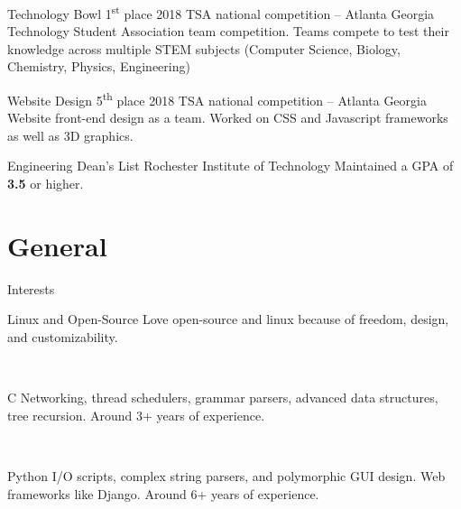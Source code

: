 \documentclass[print]{alternate}
\begin{document}
\begin{entrylist}
\entry
{}
{Technology Bowl 1\textsuperscript{st} place}
{2018 TSA national competition -- Atlanta Georgia}
{Technology Student Association team competition. Teams compete to test their knowledge across multiple STEM subjects (Computer Science, Biology, Chemistry, Physics, Engineering)}

\end{entrylist}
\begin{entrylist}

\entry
{}
{Website Design 5\textsuperscript{th} place}
{2018 TSA national competition -- Atlanta Georgia}
{Website front-end design as a team. Worked on CSS and Javascript frameworks as well as 3D graphics.}


\end{entrylist}
\begin{entrylist}

\entry
{}
{Engineering Dean's List}
{Rochester Institute of Technology}
{Maintained a GPA of \textbf{3.5} or higher.}

\end{entrylist}


\section{General}{Interests}

\vspace{-0.3cm}
\begin{entrylist}
\entry
{}
{Linux and Open-Source}
{}
{Love open-source and linux because of freedom, design, and customizability.}

\end{entrylist}\
\begin{entrylist}
\entry
{}
{C}
{}
{Networking, thread schedulers, grammar parsers, advanced data structures, tree recursion. Around 3+ years of experience.}
\end{entrylist}\
\begin{entrylist}
\entry
{}
{Python}
{}
{I/O scripts, complex string parsers, and polymorphic GUI design. Web frameworks like Django. Around 6+ years of experience.}

\end{entrylist}\
\end{document}
